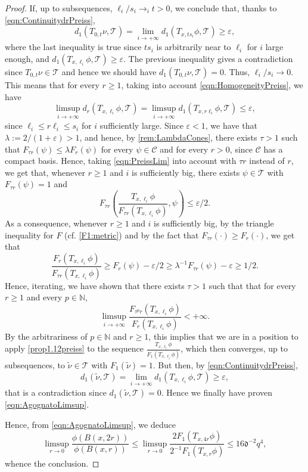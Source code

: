\documentclass[10pt, a4paper,
oneside, headinclude,footinclude]{scrartcl}
\begin{document}
\begin{proof}
If, up to subsequences, $\ell_i/s_i\to_{i}t>0$, we conclude that, thanks to \eqref{eqn:ContinuitydrPreiss}, 
$$
d_1(T_{0,t}\nu,\mathscr{T})=\lim_{i\to+\infty}d_1(T_{x,ts_i}\phi,\mathscr{T})\geq \varepsilon,
$$
where the last inequality is true since $ts_i$ is arbitrarily near to $\ell_i$ for $i$ large enough, and $d_1(T_{x,\ell_i}\phi,\mathscr{T})\geq \varepsilon$. The previous inequality gives a contradiction since $T_{0,t}\nu\in\mathscr{T}$ and hence we should have $d_1(T_{0,t}\nu,\mathscr{T})=0$. Thus, $\ell_i/s_i\to 0$. This means that for every $r\geq 1$, taking into account \eqref{eqn:HomogeneityPreiss}, we have 
\begin{equation}\label{eqn:PreissLim}
\limsup_{i\to+\infty} d_r(T_{x,\ell_i}\phi,\mathscr{T})=\limsup_{i\to+\infty}d_1(T_{x,r\ell_i}\phi,\mathscr{T})\leq \varepsilon,
\end{equation}
since $\ell_i\leq r\ell_i\leq s_i$ for $i$ sufficiently large.  Since $\varepsilon< 1$, we have that $\lambda:=2/(1+\varepsilon)>1$, and hence, by \cref{rem:LambdaCones}, there exists $\tau>1$ such that $F_{\tau r}(\psi)\leq \lambda F_r(\psi)$ for every $\psi\in\mathscr{C}$ and for every $r>0$, since $\mathscr{C}$ has a compact basis.  Hence, taking \eqref{eqn:PreissLim} into account with $\tau r$ instead of $r$, we get that, whenever $r\geq 1$ and $i$ is sufficiently big, there exists $\psi\in\mathscr{T}$ with $F_{\tau r}(\psi)=1$ and $$
F_{\tau r}\left(\frac{T_{x,\ell_i}\phi}{F_{\tau r}(T_{x,\ell_i}\phi)},\psi\right)\leq\varepsilon/2.
$$
As a consequence, whenever $r\geq 1$ and $i$ is sufficiently big, by the triangle inequality for $F$ (cf. \cref{F1:metric}) and by the fact that $F_{\tau r}(\cdot)\geq F_{r}(\cdot)$, we get that 
$$
\frac{F_{r}(T_{x,\ell_i}\phi)}{F_{\tau r}(T_{x,\ell_i}\phi)}\geq F_r(\psi)-\varepsilon/2\geq \lambda^{-1}F_{\tau r}(\psi)-\varepsilon\geq 1/2.
$$
Hence, iterating, we have shown that there exists $\tau>1$ such that that for every $r\geq 1$ and every $p\in\mathbb N$, 
$$
\limsup_{i\to +\infty}\frac{F_{\tau^p r}(T_{x,\ell_i}\phi)}{F_{r}(T_{x,\ell_i}\phi)}<+\infty.
$$
By the arbitrariness of $p\in\mathbb N$ and $r\geq 1$, this implies that we are in a position to apply \cref{prop1.12preiss} to the sequence $\frac{T_{x,\ell_i}\phi}{F_1(T_{x,\ell_i}\phi)}$, which then converges, up to subsequences, to $\widetilde\nu\in\mathscr{T}$ with $F_1(\widetilde \nu)=1$. But then, by \eqref{eqn:ContinuitydrPreiss},
$$
d_1(\widetilde\nu,\mathscr{T})=\lim_{i\to+\infty}d_1(T_{x,\ell_i}\phi,\mathscr{T})\geq \varepsilon,
$$
that is a contradiction since $d_1(\widetilde\nu,\mathscr{T})=0$. Hence we finally have proven \eqref{eqn:AgognatoLimsup}.

Hence, from \eqref{eqn:AgognatoLimsup}, we deduce
$$
\limsup_{r\to 0}\frac{\phi(B(x,2r))}{\phi(B(x,r))} \leq\limsup_{r\to 0} \frac{2F_1(T_{x,4r}\phi)}{2^{-1}F_1(T_{x,r}\phi)}\leq 16\mathfrak{d}^{-2}q^4,
$$
whence the conclusion.
\end{proof}
\end{document}
